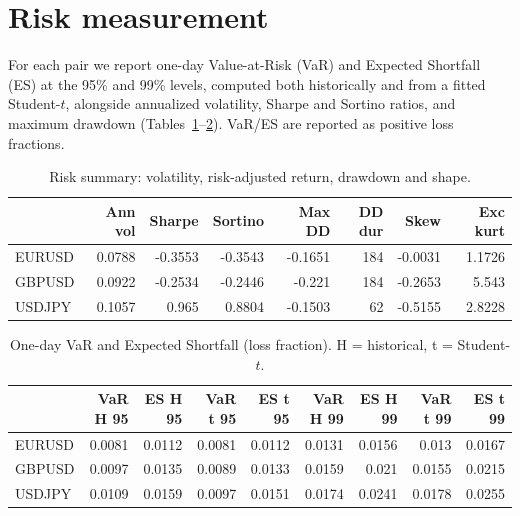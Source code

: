 \documentclass[11pt,a4paper]{article}
\begin{document}
\section{Risk measurement}
For each pair we report one-day Value-at-Risk (VaR) and Expected Shortfall (ES) at the 95\% and
99\% levels, computed both historically and from a fitted Student-$t$, alongside annualized volatility,
Sharpe and Sortino ratios, and maximum drawdown (Tables~\ref{tab:risk1}--\ref{tab:risk2}). VaR/ES are
reported as positive loss fractions.
\begin{table}[H]\centering
\small
\caption{Risk summary: volatility, risk-adjusted return, drawdown and shape.}\label{tab:risk1}
\begin{tabular}{lrrrrrrr}
\toprule
 & Ann vol & Sharpe & Sortino & Max DD & DD dur & Skew & Exc kurt \\
\midrule
EURUSD & 0.0788 & -0.3553 & -0.3543 & -0.1651 & 184 & -0.0031 & 1.1726 \\
GBPUSD & 0.0922 & -0.2534 & -0.2446 & -0.221 & 184 & -0.2653 & 5.543 \\
USDJPY & 0.1057 & 0.965 & 0.8804 & -0.1503 & 62 & -0.5155 & 2.8228 \\
\bottomrule
\end{tabular}
\end{table}
\begin{table}[H]\centering
\small
\caption{One-day VaR and Expected Shortfall (loss fraction). H = historical, t = Student-$t$.}\label{tab:risk2}
\begin{tabular}{lrrrrrrrr}
\toprule
 & VaR H 95 & ES H 95 & VaR t 95 & ES t 95 & VaR H 99 & ES H 99 & VaR t 99 & ES t 99 \\
\midrule
EURUSD & 0.0081 & 0.0112 & 0.0081 & 0.0112 & 0.0131 & 0.0156 & 0.013 & 0.0167 \\
GBPUSD & 0.0097 & 0.0135 & 0.0089 & 0.0133 & 0.0159 & 0.021 & 0.0155 & 0.0215 \\
USDJPY & 0.0109 & 0.0159 & 0.0097 & 0.0151 & 0.0174 & 0.0241 & 0.0178 & 0.0255 \\
\bottomrule
\end{tabular}
\end{table}
\end{document}
